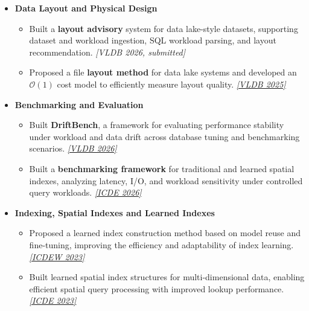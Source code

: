 \documentclass{resume}
\begin{document}
\begin{itemize}[parsep=0.4ex]


\item \textbf{Data Layout and Physical Design}
\begin{itemize}[parsep=0.3ex]
    \item Built a \textbf{layout advisory} system for data lake-style datasets, supporting dataset and workload ingestion, SQL workload parsing, and layout recommendation.
    \href{https://github.com/Liuguanli/layout_advisor}{\faGithub}
    \textit{[VLDB 2026, submitted]}

    \item Proposed a file \textbf{layout method} for data lake systems and developed an \(\mathcal{O}(1)\) cost model to efficiently measure layout quality.
    \href{https://github.com/Liuguanli/LBMC}{\faGithub}
    \href{https://www.vldb.org/pvldb/vol17/p4773-liu.pdf}{\textit{[VLDB 2025\faExternalLink]}}
\end{itemize}

\item \textbf{Benchmarking and Evaluation}
\begin{itemize}[parsep=0.3ex]
    \item Built \textbf{DriftBench}, a framework for evaluating performance stability under workload and data drift across database tuning and benchmarking scenarios.
    \href{https://github.com/Liuguanli/DriftBench}{\faGithub}
    \href{https://arxiv.org/abs/2510.10858}{\textit{[VLDB 2026\faExternalLink]}}
    \item Built a \textbf{benchmarking framework} for traditional and learned spatial indexes, analyzing latency, I/O, and workload sensitivity under controlled query workloads. \href{https://github.com/Liuguanli/rl_spatial_benchmark}{\faGithub}
\href{https://arxiv.org/abs/2512.11161}{\textit{[ICDE 2026\faExternalLink]}}
\end{itemize}

\item \textbf{Indexing, Spatial Indexes and Learned Indexes}
\begin{itemize}[parsep=0.3ex]
    \item Proposed a learned index construction method based on model reuse and fine-tuning, improving the efficiency and adaptability of index learning.
\href{https://people.eng.unimelb.edu.au/jianzhongq/papers/DBML2023_ModelReuse.pdf}{\textit{[ICDEW 2023\faExternalLink]}}

\item Built learned spatial index structures for multi-dimensional data, enabling efficient spatial query processing with improved lookup performance.
\href{https://people.eng.unimelb.edu.au/baileyj/papers/ICDE2023_ELSI.pdf}{\textit{[ICDE 2023\faExternalLink]}}


\end{itemize}
\end{itemize}
\end{document}
